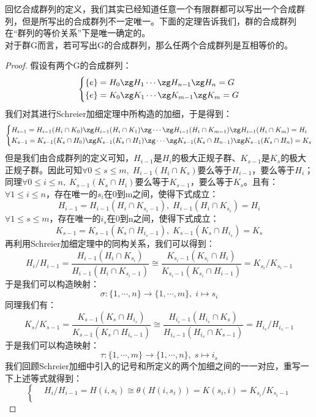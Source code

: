 回忆合成群列的定义，我们其实已经知道任意一个有限群都可以写出一个合成群列，但是所写出的合成群列不一定唯一。下面的定理告诉我们，群的合成群列在“群列的等价关系”下是唯一确定的。\\
对于群G而言，若可写出G的合成群列，那么任两个合成群列是互相等价的。\\
\begin{proof}
假设有两个G的合成群列：
\[
\left\{
\begin{aligned}
&\{e\}=H_0\zg H_1\cdots \zg H_{n-1}\zg H_n=G\\
&\{e\}=K_0\zg K_1\cdots \zg K_{m-1}\zg K_m=G
\end{aligned}
\right.
\]
我们对其进行Schreier加细定理中所构造的加细，于是得到：
\[
\left\{
\begin{aligned}
&H_{i-1}=H_{i-1}(H_i\cap K_0)\zg H_{i-1}(H_i\cap K_1)\zg \cdots \zg H_{i-1}(H_i\cap K_{m-1})\zg H_{i-1}(H_i\cap K_m)=H_i\\
&K_{s-1}=K_{s-1}(K_s\cap H_0)\zg K_{s-1}(K_s\cap H_1)\zg \cdots \zg K_{s-1}(K_s\cap H_{n-1})\zg K_{s-1}(K_s\cap H_n)=K_s
\end{aligned}
\right.
\]
但是我们由合成群列的定义可知，$H_{i-1}$是$H_i$的极大正规子群、$K_{s-1}$是$K_s$的极大正规子群。因此可知$\forall 0\leq s\leq m,\; H_{i-1}(H_i\cap K_s)$要么等于$H_{i-1}$，要么等于$H_i$；同理$\forall 0\leq i\leq n,\; K_{s-1}(K_s\cap H_i)$要么等于$K_{s-1}$，要么等于$K_s$。且有：\\
$\forall 1\leq i\leq n$，存在唯一的$s_i$在0到m之间，使得下式成立：
\[
H_{i-1}=H_{i-1}(H_i\cap K_{s_i-1}),\; H_{i-1}(H_i\cap K_{s_i})=H_i
\]
$\forall 1\leq s\leq m$，存在唯一的$i_s$在0到n之间，使得下式成立：
\[
K_{s-1}=K_{s-1}(K_s\cap H_{i_s-1}),\; K_{s-1}(K_s\cap H_{i_s})=K_s
\]
再利用Schreier加细定理中的同构关系，我们可以得到：
\[
H_i/H_{i-1}=\frac{H_{i-1}(H_i\cap K_{s_i})}{H_{i-1}(H_i\cap K_{s_i-1})}\cong \frac{K_{s_i-1}(K_{s_i}\cap H_{i})}{K_{s_i-1}(K_{s_i}\cap H_{i-1})}=K_{s_i}/K_{s_i-1}
\]
于是我们可以构造映射：
\[
\sigma\colon \{1,\cdots ,n\}\to \{1,\cdots ,m\},\; i\mapsto s_i
\]
同理我们有：
\[
K_s/K_{s-1}=\frac{K_{s-1}(K_s\cap H_{i_s})}{K_{s-1}(K_s\cap H_{i_s-1})}\cong \frac{H_{i_s-1}(H_{i_s}\cap K_{s})}{H_{i_s-1}(H_{i_s}\cap K_{s-1})}=H_{i_s}/H_{i_s-1}
\]
于是我们可以构造映射：
\[
\tau\colon\{1,\cdots,m\}\to \{1,\cdots,n\},\; s\mapsto i_s
\]
我们回顾Schreier加细中引入的记号和所定义的两个加细之间的一一对应，重写一下上述等式就得到：
\[
\left\{
\begin{aligned}
&H_i/H_{i-1}=H(i,s_i)\cong \theta(H(i,s_i))=K(s_i,i)=K_{s_i}/K_{s_i-1}\\

\end{aligned}\]
\end{proof}
